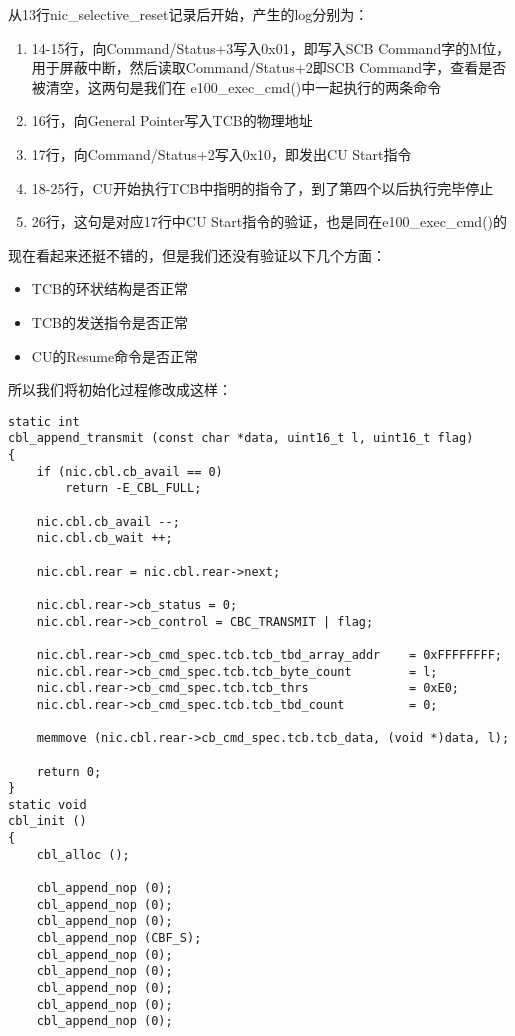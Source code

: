 \documentclass{article}
\newcommand{\funcname}[1]{{\ttfamily \small #1}}
\begin{document}
\begin{CJK*}{UTF8}{gkai}
从13行nic\_selective\_reset记录后开始，产生的log分别为：

\begin{enumerate}
\item{14-15行，向Command/Status+3写入0x01，即写入SCB Command字的M位，用于屏蔽中断，然后读取Command/Status+2即SCB Command字，查看是否被清空，这两句是我们在 \funcname{e100\_exec\_cmd()}中一起执行的两条命令}
\item{16行，向General Pointer写入TCB的物理地址}
\item{17行，向Command/Status+2写入0x10，即发出CU Start指令}
\item{18-25行，CU开始执行TCB中指明的指令了，到了第四个以后执行完毕停止}
\item{26行，这句是对应17行中CU Start指令的验证，也是同在\funcname{e100\_exec\_cmd()}的}
\end{enumerate}

现在看起来还挺不错的，但是我们还没有验证以下几个方面：

\begin{itemize}
\item{TCB的环状结构是否正常}
\item{TCB的发送指令是否正常}
\item{CU的Resume命令是否正常}
\end{itemize}

所以我们将初始化过程修改成这样：

\begin{lstlisting}[style=ccode, title={\scriptsize \ttfamily \bfseries kern/e100.c}]
static int
cbl_append_transmit (const char *data, uint16_t l, uint16_t flag)
{
    if (nic.cbl.cb_avail == 0)
        return -E_CBL_FULL;

    nic.cbl.cb_avail --;
    nic.cbl.cb_wait ++;

    nic.cbl.rear = nic.cbl.rear->next;

    nic.cbl.rear->cb_status = 0;
    nic.cbl.rear->cb_control = CBC_TRANSMIT | flag;

    nic.cbl.rear->cb_cmd_spec.tcb.tcb_tbd_array_addr    = 0xFFFFFFFF;
    nic.cbl.rear->cb_cmd_spec.tcb.tcb_byte_count        = l;
    nic.cbl.rear->cb_cmd_spec.tcb.tcb_thrs              = 0xE0;
    nic.cbl.rear->cb_cmd_spec.tcb.tcb_tbd_count         = 0;

    memmove (nic.cbl.rear->cb_cmd_spec.tcb.tcb_data, (void *)data, l);

    return 0;
}
static void
cbl_init () 
{
    cbl_alloc ();

    cbl_append_nop (0);
    cbl_append_nop (0);
    cbl_append_nop (0);
    cbl_append_nop (CBF_S);
    cbl_append_nop (0);
    cbl_append_nop (0);
    cbl_append_nop (0);
    cbl_append_nop (0);
    cbl_append_nop (0);


\end{lstlisting}
\end{CJK*}
\end{document}
